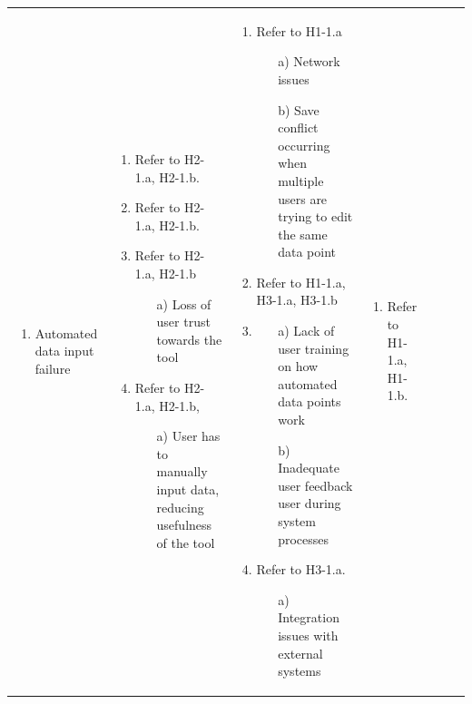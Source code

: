 \documentclass{article}
\begin{document}
\begin{landscape}
\begin{longtable}{|p{2cm}|p{4cm}|p{4cm}|p{4cm}|p{4cm}|p{2cm}|p{2cm}|}
\begin{enumerate}[leftmargin=*]
      \item Automated data input failure
  \end{enumerate} & 
  \begin{enumerate}[leftmargin=*]
      \item Refer to H2-1.a, H2-1.b.
      \item Refer to H2-1.a, H2-1.b.
      \item Refer to H2-1.a, H2-1.b 
      \begin{enumerate}
        \item[a)] Loss of user trust towards the tool
    \end{enumerate}
      \item Refer to H2-1.a, H2-1.b,
      \begin{enumerate}
        \item[a)] User has to manually input data, reducing usefulness of the tool
    \end{enumerate}
  \end{enumerate} &
  \begin{enumerate}[leftmargin=*]
       \item Refer to H1-1.a
       \begin{enumerate}
            \item[a)] Network issues
            \item[b)] Save conflict occurring when multiple users are trying to edit the same data point
        \end{enumerate}
       \item Refer to H1-1.a, H3-1.a, H3-1.b
       \item 
       \begin{enumerate}
            \item[a)] Lack of user training on how automated data points work
            \item[b)] Inadequate user feedback user during system processes
        \end{enumerate}
       \item Refer to H3-1.a.
       \begin{enumerate}
            \item[a)] Integration issues with external systems
        \end{enumerate}
  \end{enumerate} &
  \begin{enumerate}[leftmargin=*]
    \item Refer to H1-1.a, H1-1.b.
    \begin{enumerate}

\end{enumerate}
\end{enumerate}
\end{longtable}
\end{landscape}
\end{document}
